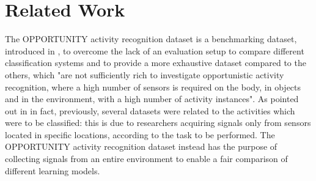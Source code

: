 
\section{Related Work}
\label{sec:related_work}
The OPPORTUNITY activity recognition dataset is a benchmarking dataset, introduced in \cite{Roggen2010}, to overcome the lack of an evaluation setup to compare different classification systems and to provide a more exhaustive dataset compared to the others, which "are not sufficiently rich to investigate opportunistic activity recognition, where a high number of sensors is required on the body, in objects and in the environment, with a high number of activity instances". As pointed out in \cite{Chavarriaga2015} in fact, previously, several datasets were related to the activities which were to be classified: this is due to researchers acquiring signals only from sensors located in specific locations, according to the task to be performed.
The OPPORTUNITY activity recognition dataset instead has the purpose of collecting signals from an entire environment to enable a fair comparison of different learning models.
